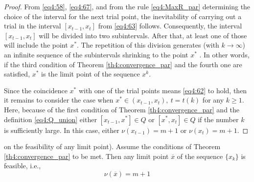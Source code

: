 \begin{proof}
  From \eqref{eq4:58}, \eqref{eq4:67}, and from the rule \eqref{eq4:MaxR_par} determining the choice of the interval for the next trial point, the inevitability of carrying out a trial in the interval $[x_{t-1},x_t]$ from \eqref{eq4:63} follows. Consequently, the interval $[x_{t-1},x_t]$ will be divided into two subintervals. After that, at least one of those will include the point $x^*$. The repetition of this division generates (with $k\to\infty$) an infinite sequence of the subintervals shrinking to the point $x^*$ . In other words, if the third condition of Theorem \ref{th4:convergence_par} and the fourth one are satisfied, $x^*$ is the limit point of the sequence ${x^k}$.

  Since the coincidence $x^*$ with one of the trial points means \eqref{eq4:62} to hold, then it remains to consider the case when $x^*\in(x_{t- 1} ,x_t ),\: t=t(k)$ for any $k\ge 1$. Here, because of the first condition of Theorem \ref{th4:convergence_par} and the definition \eqref{eq4:Q_union} either $[x_{t-1},x^*]\in Q$ or $[x^* ,x_t]\in Q$ if the number $k$ is sufficiently large. In this case, either $\nu(x_{t-1})=m+1$ or $\nu (x_t )=m+1.$
\end{proof}

\begin{lemma}
  \label{lm4:3}
  on the feasibility of any limit point). Assume the conditions of Theorem \ref{th4:convergence_par} to be met. Then any limit point $\overline x$ of the sequence $\{x_k\}$ is feasible, i.e.,
  \begin{equation}
    \label{eq4:68}
    \nu(\overline x)=m+1
  \end{equation}
\end{lemma}

